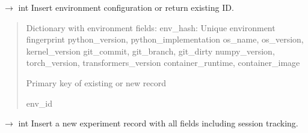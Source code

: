 \documentclass[letterpaper,10pt,english]{sphinxmanual}
\begin{document}
\begin{fulllineitems}
\begin{fulllineitems}
\label{\detokenize{core.database.sqlite_adapter:core.database.sqlite_adapter.SQLiteAdapter.insert_environment_config}}
\pysigstartsignatures
\pysiglinewithargsret
{}
{}
{{ $\rightarrow$ int}}
\pysigstopsignatures
\sphinxAtStartPar
Insert environment configuration or return existing ID.
\begin{quote}\begin{description}
\sphinxAtStartPar
{} \textendash{} Dictionary with environment fields:
\sphinxhyphen{} env\_hash: Unique environment fingerprint
\sphinxhyphen{} python\_version, python\_implementation
\sphinxhyphen{} os\_name, os\_version, kernel\_version
\sphinxhyphen{} git\_commit, git\_branch, git\_dirty
\sphinxhyphen{} numpy\_version, torch\_version, transformers\_version
\sphinxhyphen{} container\_runtime, container\_image

\sphinxAtStartPar
Primary key of existing or new record

\sphinxAtStartPar
env\_id

\end{description}\end{quote}

\end{fulllineitems}


\begin{fulllineitems}
\label{\detokenize{core.database.sqlite_adapter:core.database.sqlite_adapter.SQLiteAdapter.insert_experiment}}
\pysigstartsignatures
\pysiglinewithargsret
{}
{}
{{ $\rightarrow$ int}}
\pysigstopsignatures
\sphinxAtStartPar
Insert a new experiment record with all fields including session tracking.

\end{fulllineitems}



\end{fulllineitems}
\end{document}
